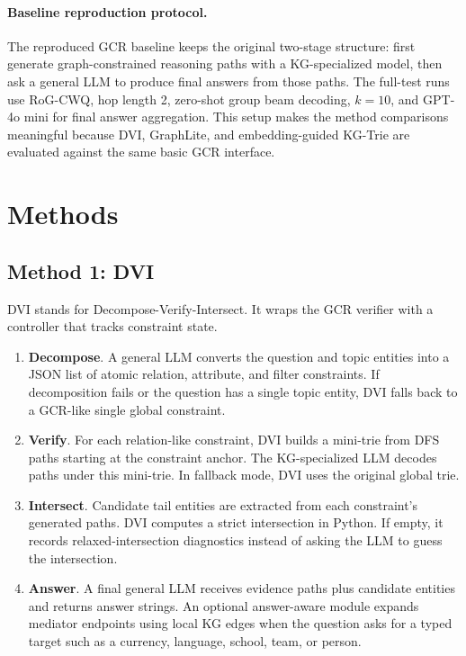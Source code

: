 \documentclass[10pt,twocolumn]{article}
\begin{document}
\paragraph{Baseline reproduction protocol.}
The reproduced GCR baseline keeps the original two-stage structure: first generate graph-constrained reasoning paths with a KG-specialized model, then ask a general LLM to produce final answers from those paths. The full-test runs use RoG-CWQ, hop length 2, zero-shot group beam decoding, $k=10$, and GPT-4o mini for final answer aggregation. This setup makes the method comparisons meaningful because DVI, GraphLite, and embedding-guided KG-Trie are evaluated against the same basic GCR interface.

\section{Methods}
\subsection{Method 1: DVI}
DVI stands for Decompose-Verify-Intersect. It wraps the GCR verifier with a controller that tracks constraint state.
\begin{enumerate}
  \item \textbf{Decompose}. A general LLM converts the question and topic entities into a JSON list of atomic relation, attribute, and filter constraints. If decomposition fails or the question has a single topic entity, DVI falls back to a GCR-like single global constraint.
  \item \textbf{Verify}. For each relation-like constraint, DVI builds a mini-trie from DFS paths starting at the constraint anchor. The KG-specialized LLM decodes paths under this mini-trie. In fallback mode, DVI uses the original global trie.
  \item \textbf{Intersect}. Candidate tail entities are extracted from each constraint's generated paths. DVI computes a strict intersection in Python. If empty, it records relaxed-intersection diagnostics instead of asking the LLM to guess the intersection.
  \item \textbf{Answer}. A final general LLM receives evidence paths plus candidate entities and returns answer strings. An optional answer-aware module expands mediator endpoints using local KG edges when the question asks for a typed target such as a currency, language, school, team, or person.
\end{enumerate}
\end{document}
